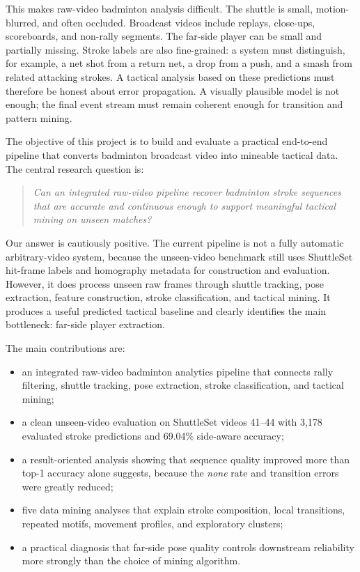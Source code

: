 \documentclass{article}
\begin{document}
This makes raw-video badminton analysis difficult. The shuttle is small,
motion-blurred, and often occluded. Broadcast videos include replays,
close-ups, scoreboards, and non-rally segments. The far-side player can be
small and partially missing. Stroke labels are also fine-grained: a system
must distinguish, for example, a net shot from a return net, a drop from a
push, and a smash from related attacking strokes. A tactical analysis based on
these predictions must therefore be honest about error propagation. A visually
plausible model is not enough; the final event stream must remain coherent
enough for transition and pattern mining.

The objective of this project is to build and evaluate a practical end-to-end
pipeline that converts badminton broadcast video into mineable tactical data.
The central research question is:

\begin{quote}
\emph{Can an integrated raw-video pipeline recover badminton stroke sequences
that are accurate and continuous enough to support meaningful tactical mining
on unseen matches?}
\end{quote}

Our answer is cautiously positive. The current pipeline is not a fully
automatic arbitrary-video system, because the unseen-video benchmark still
uses ShuttleSet hit-frame labels and homography metadata for construction and
evaluation. However, it does process unseen raw frames through shuttle
tracking, pose extraction, feature construction, stroke classification, and
tactical mining. It produces a useful predicted tactical baseline and clearly
identifies the main bottleneck: far-side player extraction.

The main contributions are:
\begin{itemize}[leftmargin=*,nosep]
  \item an integrated raw-video badminton analytics pipeline that connects
  rally filtering, shuttle tracking, pose extraction, stroke classification,
  and tactical mining;
  \item a clean unseen-video evaluation on ShuttleSet videos 41--44 with
  3,178 evaluated stroke predictions and 69.04\% side-aware accuracy;
  \item a result-oriented analysis showing that sequence quality improved more
  than top-1 accuracy alone suggests, because the \emph{none} rate and
  transition errors were greatly reduced;
  \item five data mining analyses that explain stroke composition, local
  transitions, repeated motifs, movement profiles, and exploratory clusters;
  \item a practical diagnosis that far-side pose quality controls downstream
  reliability more strongly than the choice of mining algorithm.
\end{itemize}
\end{document}

